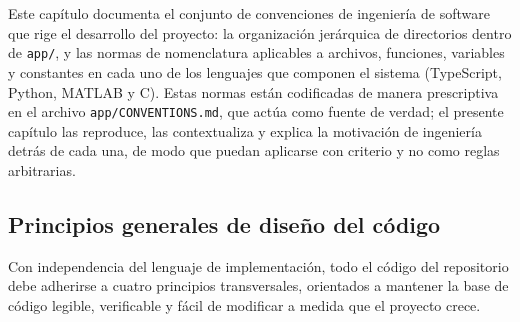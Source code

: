 \chapter{}
\label{cap:2}

Este cap\'itulo documenta el conjunto de convenciones de ingenier\'ia de
software que rige el desarrollo del proyecto: la organizaci\'on jer\'arquica
de directorios dentro de \texttt{app/}, y las normas de nomenclatura
aplicables a archivos, funciones, variables y constantes en cada uno de los
lenguajes que componen el sistema (TypeScript, Python, MATLAB y C). Estas
normas est\'an codificadas de manera prescriptiva en el archivo
\texttt{app/CONVENTIONS.md}, que act\'ua como fuente de verdad; el presente
cap\'itulo las reproduce, las contextualiza y explica la motivaci\'on de
ingenier\'ia detr\'as de cada una, de modo que puedan aplicarse con criterio
y no como reglas arbitrarias.

\section{Principios generales de dise\~no del c\'odigo}

Con independencia del lenguaje de implementaci\'on, todo el c\'odigo del
repositorio debe adherirse a cuatro principios transversales, orientados a
mantener la base de c\'odigo legible, verificable y f\'acil de modificar a
medida que el proyecto crece.

